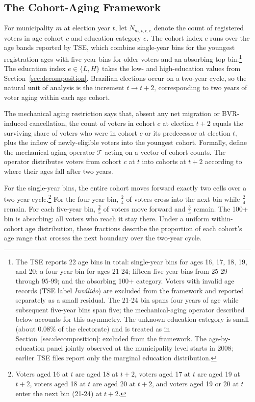 \subsection{The Cohort-Aging Framework}
\label{ssec:decomposition_mun_math}

For municipality $m$ at election year $t$, let $N_{m,t,c,e}$ denote the count of registered voters in age cohort $c$ and education category $e$. The cohort index $c$ runs over the age bands reported by TSE, which combine single-year bins for the youngest registration ages with five-year bins for older voters and an absorbing top bin.\footnote{The TSE reports 22 age bins in total: single-year bins for ages 16, 17, 18, 19, and 20; a four-year bin for ages 21-24; fifteen five-year bins from 25-29 through 95-99; and the absorbing 100+ category. Voters with invalid age records (TSE label \emph{Inv\'alido}) are excluded from the framework and reported separately as a small residual. The 21-24 bin spans four years of age while subsequent five-year bins span five; the mechanical-aging operator described below accounts for this asymmetry. The unknown-education category is small (about 0.08\% of the electorate) and is treated as in Section~\ref{sec:decomposition}: excluded from the framework. The age-by-education panel jointly observed at the municipality level starts in 2008; earlier TSE files report only the marginal education distribution.} The education index $e \in \{L, H\}$ takes the low- and high-education values from Section~\ref{sec:decomposition}. Brazilian elections occur on a two-year cycle, so the natural unit of analysis is the increment $t \to t+2$, corresponding to two years of voter aging within each age cohort.

The mechanical aging restriction says that, absent any net migration or BVR-induced cancellation, the count of voters in cohort $c$ at election $t+2$ equals the surviving share of voters who were in cohort $c$ or its predecessor at election $t$, plus the inflow of newly-eligible voters into the youngest cohort. Formally, define the mechanical-aging operator $\mathcal{T}$ acting on a vector of cohort counts. The operator distributes voters from cohort $c$ at $t$ into cohorts at $t+2$ according to where their ages fall after two years.

For the single-year bins, the entire cohort moves forward exactly two cells over a two-year cycle.\footnote{Voters aged 16 at $t$ are aged 18 at $t+2$, voters aged 17 at $t$ are aged 19 at $t+2$, voters aged 18 at $t$ are aged 20 at $t+2$, and voters aged 19 or 20 at $t$ enter the next bin (21-24) at $t+2$.} For the four-year bin, $\tfrac{2}{4}$ of voters cross into the next bin while $\tfrac{2}{4}$ remain. For each five-year bin, $\tfrac{2}{5}$ of voters move forward and $\tfrac{3}{5}$ remain. The 100+ bin is absorbing: all voters who reach it stay there. Under a uniform within-cohort age distribution, these fractions describe the proportion of each cohort's age range that crosses the next boundary over the two-year cycle.

